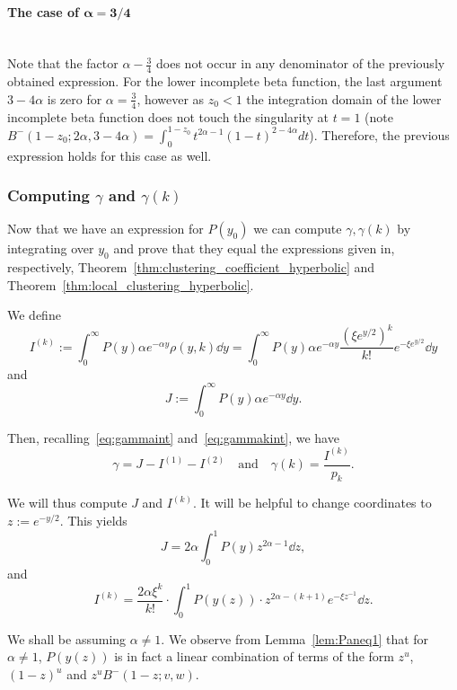 \paragraph{The case of $\bm{\alpha = 3/4}$}\hfill\\

Note that the factor $\alpha-\frac{3}{4}$ does not occur in any denominator of the previously obtained expression. 
For the lower incomplete beta function, the last argument $3-4\alpha$ is zero for $\alpha=\frac{3}{4}$, however as $z_0 < 1$ the 
integration domain of the lower incomplete beta function does not touch the singularity at $t=1$ 
(note $B^-(1-z_0;2\alpha,3-4\alpha) = \int_0^{1-z_0} t^{2\alpha-1} (1-t)^{2-4\alpha}dt$). 
Therefore, the previous expression holds for this case as well.





\subsubsection{Computing $\gamma$ and $\gamma(k)$\label{ssec:exact_expressions_clustering_P}}



Now that we have an expression for $P(y_0)$ we can compute $\gamma, \gamma(k)$ by integrating 
over $y_0$ and prove that they equal the expressions given in, respectively, Theorem~\ref{thm:clustering_coefficient_hyperbolic} and 
Theorem~\ref{thm:local_clustering_hyperbolic}.

We define
\[
	I^{(k)} := 
	\int_0^{\infty} P(y) \alpha e^{-\alpha y}\rho(y,k) \dd y = 
	\int_0^{\infty} P(y) \alpha e^{-\alpha y} \frac{\left(\xi e^{y/2}\right)^k}{k!} e^{-\xi e^{y/2}} \dd y
\]
and
\[
	J := \int_0^\infty P(y) \alpha e^{-\alpha y} \dd y.
\]

Then, recalling~\eqref{eq:gammaint} and~\eqref{eq:gammakint}, we have
\[   
	\gamma = J - I^{(1)} - I^{(2)} \quad \text{and} \quad
	\gamma(k) = \frac{I^{(k)}}{p_k}.
\]

We will thus compute $J$ and $I^{(k)}$. It will be helpful to change coordinates to $z := e^{-y/2}$. This yields 
\[ 
	J = 2 \alpha \int_0^1 P(y) z^{2\alpha-1} \dd z, 
\]
and 
\[ 
	I^{(k)} = \frac{2 \alpha \xi^k}{k!} \cdot \int_0^1 P(y(z)) \cdot z^{2\alpha-(k+1)} e^{-\xi z^{-1}} \dd z. 
\]

We shall be assuming $\alpha \not = 1$. 
We observe from Lemma~\ref{lem:Paneq1} that for $\alpha \not =1$, $P(y(z))$ is in fact a linear combination 
of terms of the form $z^u$, $(1-z)^u$ and $z^u B^-(1-z;v,w)$.

